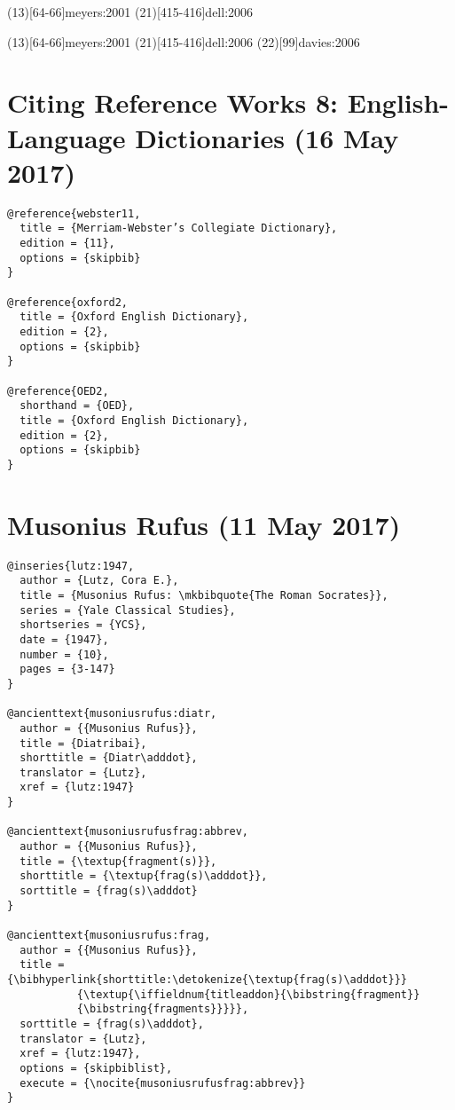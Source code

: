 \documentclass[a4paper]{article}
\begin{document}
\examplecite(13)[64-66]{meyers:2001}
\examplecite(21)[415-416]{dell:2006}
\citereset
\begin{verbtext}
  \usepackage[style=sbl,citepages=separate]{biblatex}
\end{verbtext}
\makeatletter
{\cbx@opt@citepages@separate
 \examplecite(13)[64-66]{meyers:2001}
}
\makeatother
\examplecite(21)[415-416]{dell:2006}
\examplecite(22)[99]{davies:2006}
\examplebibliography
{}

\section{Citing Reference Works 8: English-Language Dictionaries (16 May 2017)}

\begin{verbatim}
@reference{webster11,
  title = {Merriam-Webster’s Collegiate Dictionary},
  edition = {11},
  options = {skipbib}
}

@reference{oxford2,
  title = {Oxford English Dictionary},
  edition = {2},
  options = {skipbib}
}

@reference{OED2,
  shorthand = {OED},
  title = {Oxford English Dictionary},
  edition = {2},
  options = {skipbib}
}
\end{verbatim}

\exampleabbreviations

\section{Musonius Rufus (11 May 2017)}

\begin{verbatim}
@inseries{lutz:1947,
  author = {Lutz, Cora E.},
  title = {Musonius Rufus: \mkbibquote{The Roman Socrates}},
  series = {Yale Classical Studies},
  shortseries = {YCS},
  date = {1947},
  number = {10},
  pages = {3-147}
}

@ancienttext{musoniusrufus:diatr,
  author = {{Musonius Rufus}},
  title = {Diatribai},
  shorttitle = {Diatr\adddot},
  translator = {Lutz},
  xref = {lutz:1947}
}

@ancienttext{musoniusrufusfrag:abbrev,
  author = {{Musonius Rufus}},
  title = {\textup{fragment(s)}},
  shorttitle = {\textup{frag(s)\adddot}},
  sorttitle = {frag(s)\adddot}
}

@ancienttext{musoniusrufus:frag,
  author = {{Musonius Rufus}},
  title = {\bibhyperlink{shorttitle:\detokenize{\textup{frag(s)\adddot}}}
           {\textup{\iffieldnum{titleaddon}{\bibstring{fragment}}
           {\bibstring{fragments}}}}},
  sorttitle = {frag(s)\adddot},
  translator = {Lutz},
  xref = {lutz:1947},
  options = {skipbiblist},
  execute = {\nocite{musoniusrufusfrag:abbrev}}
}
\end{verbatim}
\end{document}
